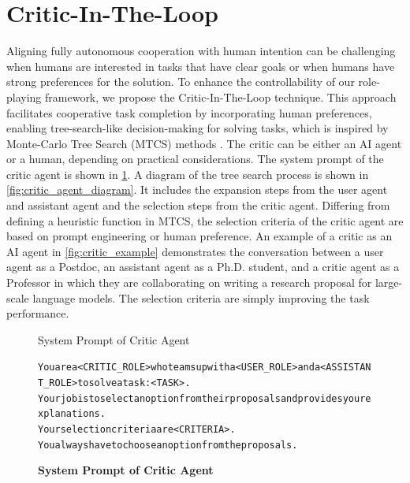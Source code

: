 \clearpage
\section{Critic-In-The-Loop}
Aligning fully autonomous cooperation with human intention can be challenging when humans are interested in tasks that have clear goals or when humans have strong preferences for the solution. To enhance the controllability of our role-playing framework, we propose the Critic-In-The-Loop technique. This approach facilitates cooperative task completion by incorporating human preferences, enabling tree-search-like decision-making for solving tasks, which is inspired by Monte-Carlo Tree Search (MTCS) methods \cite{silver2016mastering}. The critic can be either an AI agent or a human, depending on practical considerations. The system prompt of the critic agent is shown in \figLabel \ref{fig:critic_agent_prompt}. A diagram of the tree search process is shown in \figLabel \ref{fig:critic_agent_diagram}. It includes the expansion steps from the user agent and assistant agent and the selection steps from the critic agent. Differing from defining a heuristic function in MTCS, the selection criteria of the critic agent are based on prompt engineering or human preference. An example of a critic as an AI agent in \figLabel \ref{fig:critic_example} demonstrates the conversation between a user agent as a Postdoc, an assistant agent as a Ph.D. student, and a critic agent as a Professor in which they are collaborating on writing a research proposal for large-scale language models. The selection criteria are simply improving the task performance.

\begin{figure}[h]
	\begin{AIBox}{System Prompt of Critic Agent}
		\parbox[t]{\textwidth}{%
			\scriptsize \begin{alltt}
				You are a <CRITIC\_ROLE> who teams up with a <USER\_ROLE> and a <ASSISTANT\_ROLE> to solve a task: <TASK>. \\
				Your job is to select an option from their proposals and provides your explanations. \\
				Your selection criteria are <CRITERIA>. \\
				You always have to choose an option from the proposals.
			\end{alltt}}
	\end{AIBox}
	\caption{\textbf{System Prompt of Critic Agent}}
	\label{fig:critic_agent_prompt}
\end{figure}


